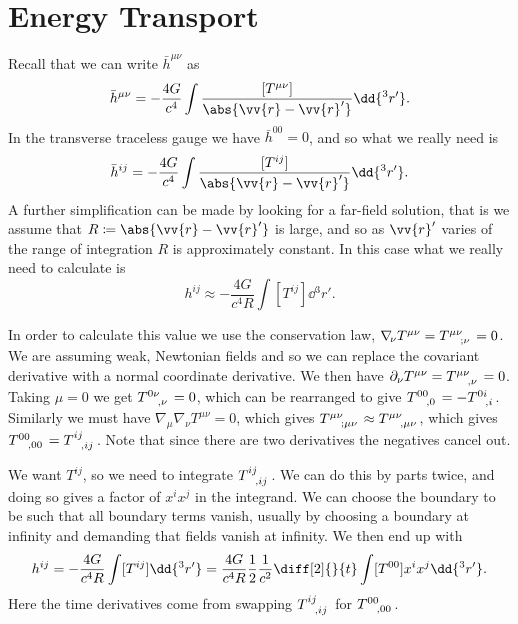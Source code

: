 \documentclass[fleqn]{NotesClass}
\newcommand*{\covariantDerivative}[1]{\nabla_{\!#1}}
\begin{document}
    \section{Energy Transport}
    Recall that we can write \(\bar{h}^{\mu\nu}\) as
    \begin{equation}
        \bar{h}^{\mu\nu} = -\frac{4G}{c^4} \int \frac{[T^{\mu\nu}]}{\abs{\vv{r} - \vv{r}'}} \dd{^3r'}.
    \end{equation}
    In the transverse traceless gauge we have \(\bar{h}^{00} = 0\), and so what we really need is
    \begin{equation}
        \bar{h}^{ij} = -\frac{4G}{c^4} \int \frac{[T^{ij}]}{\abs{\vv{r} - \vv{r}'}} \dd{^3r'}.
    \end{equation}
    A further simplification can be made by looking for a far-field solution, that is we assume that \(R \coloneqq \abs{\vv{r} - \vv{r}'}\) is large, and so as \(\vv{r}'\) varies of the range of integration \(R\) is approximately constant.
    In this case what we really need to calculate is
    \begin{equation}
        h^{ij} \approx -\frac{4G}{c^4R} \int[T^{ij}] \dd{^3r'}.
    \end{equation}
    
    In order to calculate this value we use the conservation law, \(\covariantDerivative{\nu}T^{\mu\nu} = \tensor{T}{^{\mu\nu}_{;\nu}} = 0\).
    We are assuming weak, Newtonian fields and so we can replace the covariant derivative with a normal coordinate derivative.
    We then have \(\partial_\nu T^{\mu\nu} = \tensor{T}{^{\mu\nu}_{,\nu}} = 0\).
    Taking \(\mu = 0\) we get \(\tensor{T}{^{0\nu}_{,\nu}} = 0\), which can be rearranged to give \(\tensor{T}{^{00}_{,0}} = -\tensor{T}{^{0i}_{,i}}\).
    Similarly we must have \(\covariantDerivative{\mu}\covariantDerivative{\nu}T^{\mu\nu} = 0\), which gives \(\tensor{T}{^{\mu\nu}_{;\mu\nu}} \approx \tensor{T}{^{\mu\nu}_{,\mu\nu}}\), which gives \(\tensor{T}{^{00}_{,00}} = \tensor{T}{^{ij}_{,ij}}\).
    Note that since there are two derivatives the negatives cancel out.
    
    We want \(T^{ij}\), so we need to integrate \(\tensor{T}{^{ij}_{,ij}}\).
    We can do this by parts twice, and doing so gives a factor of \(x^ix^j\) in the integrand.
    We can choose the boundary to be such that all boundary terms vanish, usually by choosing a boundary at infinity and demanding that fields vanish at infinity.
    We then end up with
    \begin{equation}
        h^{ij} = -\frac{4G}{c^4R} \int [T^{ij}] \dd{^3r'} = \frac{4G}{c^4R} \frac{1}{2}\frac{1}{c^2}\diff[2]{}{t} \int [T^{00}]x^ix^j \dd{^3r'}.
    \end{equation}
    Here the time derivatives come from swapping \(\tensor{T}{^{ij}_{,ij}}\) for \(\tensor{T}{^{00}_{,00}}\).
    
\end{document}
